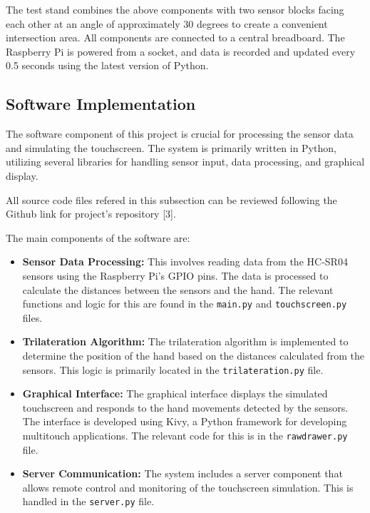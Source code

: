 \documentclass[12pt,a4paper]{article}
\begin{document}
The test stand combines the above components with two sensor blocks facing each other at an angle of approximately 30 degrees to create a convenient intersection area. All components are connected to a central breadboard. The Raspberry Pi is powered from a socket, and data is recorded and updated every 0.5 seconds using the latest version of Python.

\subsection{Software Implementation}
The software component of this project is crucial for processing the sensor data and simulating the touchscreen. The system is primarily written in Python, utilizing several libraries for handling sensor input, data processing, and graphical display.

All source code files refered in this subsection can be reviewed following the Github link for project's repository [3].

The main components of the software are:

\begin{itemize}
    \item \textbf{Sensor Data Processing:} This involves reading data from the HC-SR04 sensors using the Raspberry Pi's GPIO pins. The data is processed to calculate the distances between the sensors and the hand. The relevant functions and logic for this are found in the \texttt{main.py} and \texttt{touchscreen.py} files.
    \item \textbf{Trilateration Algorithm:} The trilateration algorithm is implemented to determine the position of the hand based on the distances calculated from the sensors. This logic is primarily located in the \texttt{trilateration.py} file.
    \item \textbf{Graphical Interface:} The graphical interface displays the simulated touchscreen and responds to the hand movements detected by the sensors. The interface is developed using Kivy, a Python framework for developing multitouch applications. The relevant code for this is in the \texttt{rawdrawer.py} file.
    \item \textbf{Server Communication:} The system includes a server component that allows remote control and monitoring of the touchscreen simulation. This is handled in the \texttt{server.py} file.
\end{itemize}
\end{document}
